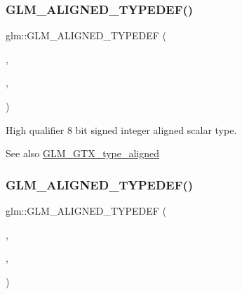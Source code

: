 \subsubsection{\texorpdfstring{G\+L\+M\+\_\+\+A\+L\+I\+G\+N\+E\+D\+\_\+\+T\+Y\+P\+E\+D\+E\+F()}{GLM\_ALIGNED\_TYPEDEF()}\hspace{0.1cm}{\footnotesize\ttfamily [25/209]}}
{\footnotesize\ttfamily glm\+::\+G\+L\+M\+\_\+\+A\+L\+I\+G\+N\+E\+D\+\_\+\+T\+Y\+P\+E\+D\+EF (\begin{DoxyParamCaption}\item[{\hyperlink{group__gtc__type__precision_ga57c86999e666760c304453f9bfdc09d1}{highp\+\_\+int8}}]{,  }\item[{aligned\+\_\+highp\+\_\+int8}]{,  }\item[{1}]{ }\end{DoxyParamCaption})}

High qualifier 8 bit signed integer aligned scalar type. \begin{DoxySeeAlso}{See also}
\hyperlink{group__gtx__type__aligned}{G\+L\+M\+\_\+\+G\+T\+X\+\_\+type\+\_\+aligned} 
\end{DoxySeeAlso}
\mbox{\label{group__gtx__type__aligned_ga7a751b3aff24c0259f4a7357c2969089}} 
\subsubsection{\texorpdfstring{G\+L\+M\+\_\+\+A\+L\+I\+G\+N\+E\+D\+\_\+\+T\+Y\+P\+E\+D\+E\+F()}{GLM\_ALIGNED\_TYPEDEF()}\hspace{0.1cm}{\footnotesize\ttfamily [26/209]}}
{\footnotesize\ttfamily glm\+::\+G\+L\+M\+\_\+\+A\+L\+I\+G\+N\+E\+D\+\_\+\+T\+Y\+P\+E\+D\+EF (\begin{DoxyParamCaption}\item[{\hyperlink{group__gtc__type__precision_gaf0430ed80e88c0d1dfbe47f359659c81}{highp\+\_\+int16}}]{,  }\item[{aligned\+\_\+highp\+\_\+int16}]{,  }\item[{2}]{ }\end{DoxyParamCaption})}


